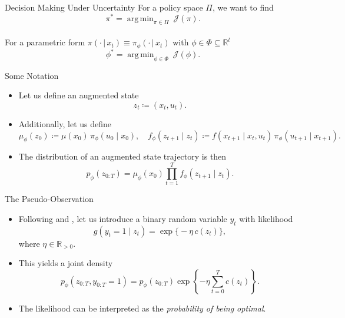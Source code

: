 \documentclass[10pt, aspectratio=1610]{beamer}
\DeclareMathOperator*{\argmin}{arg\,min}
\newcommand{\given}{\,|\,}
\begin{document}
    \begin{frame}{Decision Making Under Uncertainty}
        For a policy space $\Pi$, we want to find
        \begin{equation*}
            \pi^{*} = \argmin_{\pi \in \Pi} \medspace \mathcal{J}(\pi).
        \end{equation*}
        ~ \\
        For a parametric form $\pi(\cdot \given x_t) \equiv \pi_{\phi}(\cdot \given x_t)$ with $\phi \in \Phi \subseteq \mathbb{R}^{l}$
        \begin{equation*}
            \phi^{*} = \argmin_{\phi \in \Phi} \medspace \mathcal{J}(\phi).
        \end{equation*}
    \end{frame}

    \begin{frame}{Some Notation}
      \begin{itemize}[<+->]
        \item Let us define an augmented state
          \begin{equation}
            z_t \coloneq (x_t, u_t).
          \end{equation}
        \item Additionally, let us define
          \begin{equation}
            \mu_{\phi}(z_0) \coloneqq \mu(x_0) \, \pi_{\phi}(u_0 \mid x_0), \quad f_{\phi}(z_{t+1} \mid z_t) \coloneqq f(x_{t+1} \mid x_t, u_t) \, \pi_{\phi}(u_{t+1} \mid x_{t+1}).
          \end{equation}
        \item The distribution of an augmented state trajectory is then
          \begin{equation}
            p_\phi(z_{0:T}) = \mu_\phi(x_0) \prod_{t=1}^T f_{\phi}(z_{t+1} \mid z_t).
          \end{equation}
      \end{itemize}
    \end{frame}

    \begin{frame}{The Pseudo-Observation}
      \begin{itemize}[<+->]
        \item Following \citet{toussaint2006probabilistic} and \citet{rawlik2013probabilistic}, let us introduce a binary random variable $y_t$ with likelihood
          \begin{equation}
            g(y_t = 1 \mid z_t) = \exp \big\{-\eta \, c(z_t)\big\},
          \end{equation}
          where $\eta \in \mathbb{R}_{>0}$.
        \item This yields a joint density
          \begin{equation}
            p_\phi(z_{0:T}, y_{0:T} = 1) = p_\phi(z_{0:T}) \exp\left\{-\eta \sum_{t=0}^T c(z_t)\right\}.
          \end{equation}
        \item The likelihood can be interpreted as the \emph{probability of being optimal}.
      \end{itemize}
    \end{frame}
\end{document}
